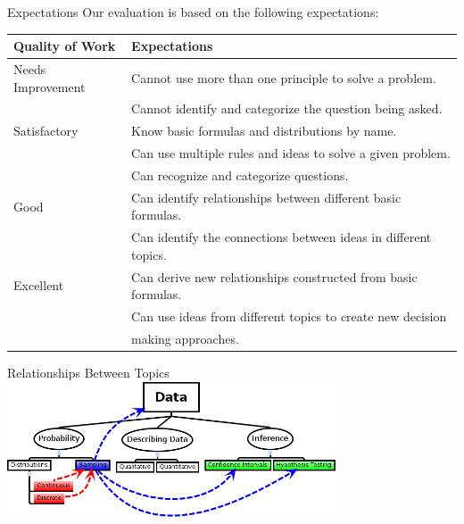 \begin{frame}{Expectations}
\vspace*{-2em}
  Our evaluation is based on the following expectations: \\
\footnotesize \hspace*{-2em}
\begin{tabular}{|l@{\hspace{2em}}l|} \hline
  Quality of Work    & Expectations \\ \hline
  Needs Improvement  & Cannot use more than one principle to solve a problem. \\
                     & Cannot identify and categorize the question
                       being asked. \\ \hline
  Satisfactory       & Know basic formulas and distributions by name. \\
                     & Can use multiple rules and ideas to solve a
                       given problem.\\ 
                     & Can recognize and categorize questions. \\
 \hline
  Good               &  Can identify relationships between different
                        basic formulas. \\
                     &  Can identify the connections between ideas in
                        different topics. \\ \hline
  Excellent          &  Can derive new relationships constructed from
                        basic formulas. \\
                     &  Can use ideas from different topics to create
                        new decision \\
                     & making approaches. \\ \hline
\end{tabular}
\end{frame}

\begin{frame}{Relationships Between Topics}
  \includegraphics[height=4cm]{bigIdeas}
\end{frame}


